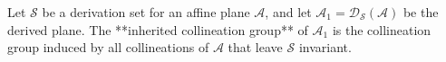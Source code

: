 Let $\mathcal{S}$ be a derivation set for an affine plane $\mathcal{A}$, and let $\mathcal{A}_1 = \mathcal{D}_{\mathcal{S}}(\mathcal{A})$ be the derived plane. The **inherited collineation group** of $\mathcal{A}_1$ is the collineation group induced by all collineations of $\mathcal{A}$ that leave $\mathcal{S}$ invariant.
